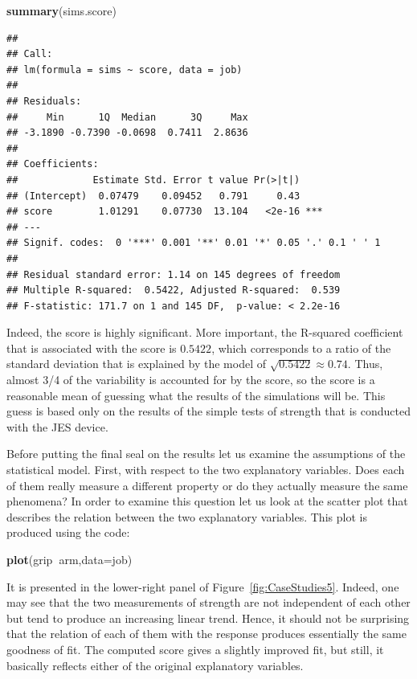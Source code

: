 \documentclass[
]{krantz}
\makeatletter
\newenvironment{Shaded}{\begin{snugshade}}{\end{snugshade}}
\newcommand{\DataTypeTok}[1]{\textcolor[rgb]{0.13,0.29,0.53}{#1}}
\newcommand{\KeywordTok}[1]{\textcolor[rgb]{0.13,0.29,0.53}{\textbf{#1}}}
\newcommand{\NormalTok}[1]{#1}
\newcommand{\OperatorTok}[1]{\textcolor[rgb]{0.81,0.36,0.00}{\textbf{#1}}}
\newenvironment{kframe}{%
\medskip{}
\setlength{\fboxsep}{.8em}
 \def\at@end@of@kframe{}%
 \ifinner\ifhmode%
  \def\at@end@of@kframe{\end{minipage}}%
  \begin{minipage}{\columnwidth}%
 \fi\fi%
 \def\FrameCommand##1{\hskip\@totalleftmargin \hskip-\fboxsep
 \colorbox{shadecolor}{##1}\hskip-\fboxsep
     \hskip-\linewidth \hskip-\@totalleftmargin \hskip\columnwidth}%
 \MakeFramed {\advance\hsize-\width
   \@totalleftmargin\z@ \linewidth\hsize
   \@setminipage}}%
 {\par\unskip\endMakeFramed%
 \at@end@of@kframe}
\renewenvironment{Shaded}{\begin{kframe}}{\end{kframe}}
\theoremstyle{definition}
\theoremstyle{definition}
\theoremstyle{definition}
\theoremstyle{remark}
\makeatother
\begin{document}
\begin{Shaded}
\begin{Highlighting}[]
\KeywordTok{summary}\NormalTok{(sims.score)}
\end{Highlighting}
\end{Shaded}

\begin{verbatim}
## 
## Call:
## lm(formula = sims ~ score, data = job)
## 
## Residuals:
##     Min      1Q  Median      3Q     Max 
## -3.1890 -0.7390 -0.0698  0.7411  2.8636 
## 
## Coefficients:
##             Estimate Std. Error t value Pr(>|t|)    
## (Intercept)  0.07479    0.09452   0.791     0.43    
## score        1.01291    0.07730  13.104   <2e-16 ***
## ---
## Signif. codes:  0 '***' 0.001 '**' 0.01 '*' 0.05 '.' 0.1 ' ' 1
## 
## Residual standard error: 1.14 on 145 degrees of freedom
## Multiple R-squared:  0.5422, Adjusted R-squared:  0.539 
## F-statistic: 171.7 on 1 and 145 DF,  p-value: < 2.2e-16
\end{verbatim}

Indeed, the score is highly significant. More important, the R-squared
coefficient that is associated with the score is \(0.5422\), which
corresponds to a ratio of the standard deviation that is explained by
the model of \(\sqrt{0.5422} \approx 0.74\). Thus, almost 3/4 of the
variability is accounted for by the score, so the score is a reasonable
mean of guessing what the results of the simulations will be. This guess
is based only on the results of the simple tests of strength that is
conducted with the JES device.

Before putting the final seal on the results let us examine the
assumptions of the statistical model. First, with respect to the two
explanatory variables. Does each of them really measure a different
property or do they actually measure the same phenomena? In order to
examine this question let us look at the scatter plot that describes the
relation between the two explanatory variables. This plot is produced
using the code:

\begin{Shaded}
\begin{Highlighting}[]
\KeywordTok{plot}\NormalTok{(grip}\OperatorTok{~}\NormalTok{arm,}\DataTypeTok{data=}\NormalTok{job)}
\end{Highlighting}
\end{Shaded}

It is presented in the lower-right panel of
Figure~\ref{fig:CaseStudies5}. Indeed, one may see that the two
measurements of strength are not independent of each other but tend to
produce an increasing linear trend. Hence, it should not be surprising
that the relation of each of them with the response produces essentially
the same goodness of fit. The computed score gives a slightly improved
fit, but still, it basically reflects either of the original explanatory
variables.
\end{document}
